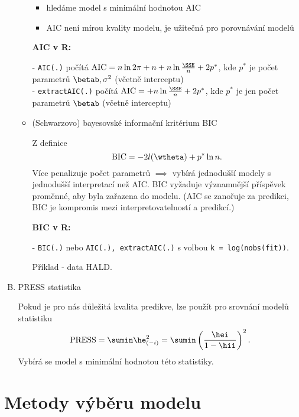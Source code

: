 \begin{enumerate}[A)]
\begin{itemize}
\begin{remark}
\begin{itemize}
\item hledáme model s minimální hodnotou AIC
\item AIC není mírou kvality modelu, je užitečná pro porovnávání modelů
\end{itemize}
\end{remark}

\textbf{AIC v R:}

- \verb|AIC(.)| počítá $\AIC = n \ln 2 \pi + n + n \ln \frac{\SSE}{n} + 2p^*$, kde $p^*$ je počet parametrů $\betab, \sigma^2$ (včetně interceptu) \\
- \verb|extractAIC(.)| počítá $\AIC =  + n \ln \frac{\SSE}{n} + 2p^*$, kde $p^*$ je jen počet parametrů $\betab$ (včetně interceptu)

\item 
(Schwarzovo) bayesovské informační kritérium BIC

\newcommand{\BIC}{\mathrm{BIC}}

Z definice
$$
\BIC = -2 l(\wtheta) + p^* \ln n.
$$
Více penalizuje počet parametrů $\implies$ vybírá jednodušší modely s jednodušší interpretací než AIC. BIC vyžaduje významnější příspěvek proměnné, aby byla zařazena do modelu. (AIC se zanořuje za predikci, BIC je kompromis mezi interpretovatelností a predikcí.)

\textbf{BIC v R:}

- \verb|BIC(.)| nebo \verb|AIC(.), extractAIC(.)| s volbou \verb|k = log(nobs(fit))|.

Příklad - data HALD.
\end{itemize}

\item 
PRESS statistika

\newcommand{\PRESS}{\mathrm{PRESS}}

Pokud je pro nás důležitá kvalita predikve, lze použít pro srovnání modelů statistiku
$$
\PRESS = \sumin \he_{(-i)}^2 = \sumin \left(  \frac{\hei}{1 - \hii} \right)^2.
$$
Vybírá se model s minimální hodnotou této statistiky.
\end{enumerate}

\section{Metody výběru modelu}

